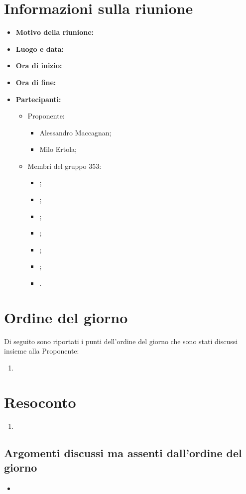 \documentclass[VER-2017-12-08.tex]{subfiles}
\begin{document}
\chapter{Informazioni sulla riunione}
\begin{itemize}
	\item \textbf{Motivo della riunione:}
	\item \textbf{Luogo e data:}
	\item \textbf{Ora di inizio:} 
	\item \textbf{Ora di fine:} 
	\item \textbf{Partecipanti:}
	\begin{itemize}
		\item Proponente:
		\begin{itemize}
			\item Alessandro Maccagnan;
			\item Milo Ertola;
		\end{itemize}
		\item Membri del gruppo 353:
		\begin{itemize}
			\item \Davide;
			\item \Elena;
			\item \Gianluca;
			\item \Mirco;
			\item \Parwinder;
			\item \Riccardo;
			\item \Valentina.
		\end{itemize}
	\end{itemize}
\end{itemize}
\chapter{Ordine del giorno}	
Di seguito sono riportati i punti dell'ordine del giorno che sono stati discussi insieme alla Proponente:
\begin{enumerate}
	\item 
\end{enumerate}
\chapter{Resoconto}
\begin{enumerate}
	\item 
\end{enumerate}
\section{Argomenti discussi ma assenti dall'ordine del giorno}
\begin{itemize}
	\item 
\end{itemize}
\end{document}
